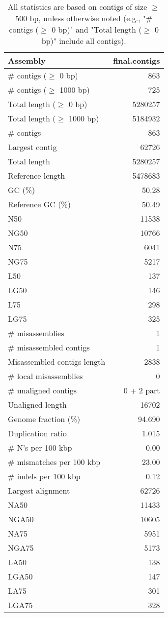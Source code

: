 \documentclass[12pt,a4paper]{article}
\begin{document}
\begin{table}[ht]
\begin{center}
\caption{All statistics are based on contigs of size $\geq$ 500 bp, unless otherwise noted (e.g., "\# contigs ($\geq$ 0 bp)" and "Total length ($\geq$ 0 bp)" include all contigs).}
\begin{tabular}{|l*{1}{|r}|}
\hline
Assembly & final.contigs \\ \hline
\# contigs ($\geq$ 0 bp) & 863 \\ \hline
\# contigs ($\geq$ 1000 bp) & 725 \\ \hline
Total length ($\geq$ 0 bp) & 5280257 \\ \hline
Total length ($\geq$ 1000 bp) & 5184932 \\ \hline
\# contigs & 863 \\ \hline
Largest contig & 62726 \\ \hline
Total length & 5280257 \\ \hline
Reference length & 5478683 \\ \hline
GC (\%) & 50.28 \\ \hline
Reference GC (\%) & 50.49 \\ \hline
N50 & 11538 \\ \hline
NG50 & 10766 \\ \hline
N75 & 6041 \\ \hline
NG75 & 5217 \\ \hline
L50 & 137 \\ \hline
LG50 & 146 \\ \hline
L75 & 298 \\ \hline
LG75 & 325 \\ \hline
\# misassemblies & 1 \\ \hline
\# misassembled contigs & 1 \\ \hline
Misassembled contigs length & 2838 \\ \hline
\# local misassemblies & 0 \\ \hline
\# unaligned contigs & 0 + 2 part \\ \hline
Unaligned length & 16702 \\ \hline
Genome fraction (\%) & 94.690 \\ \hline
Duplication ratio & 1.015 \\ \hline
\# N's per 100 kbp & 0.00 \\ \hline
\# mismatches per 100 kbp & 23.00 \\ \hline
\# indels per 100 kbp & 0.12 \\ \hline
Largest alignment & 62726 \\ \hline
NA50 & 11433 \\ \hline
NGA50 & 10605 \\ \hline
NA75 & 5951 \\ \hline
NGA75 & 5173 \\ \hline
LA50 & 138 \\ \hline
LGA50 & 147 \\ \hline
LA75 & 301 \\ \hline
LGA75 & 328 \\ \hline
\end{tabular}
\end{center}
\end{table}
\end{document}
